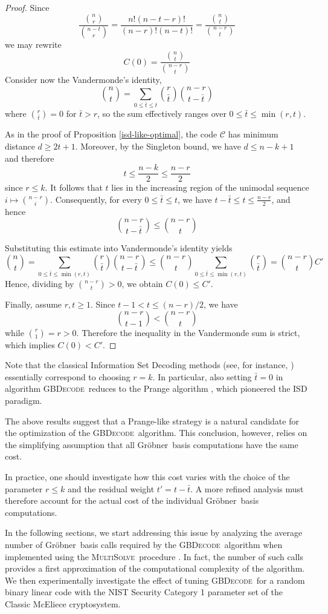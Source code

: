 \documentclass{amsart}
\def\Gr{Gr\"obner}
\def\MultiSolve{{\textsc{MultiSolve}}}
\def\GBDecode{{\textsc{GBDecode}}}
\def\cC{{\mathcal{C}}}
\def\bt{{\bar{t}}}
\begin{document}
\begin{proof}
Since
\[
\frac{\binom{n}{r}}{\binom{n-t}{r}} = \frac{n! (n-t-r)!}{(n-r)! (n-t)!} = \frac{\binom{n}{t}}{\binom{n-r}{t}}
\]
we may rewrite
\[
C(0) = \frac{\binom{n}{t}}{\binom{n-r}{t}}
\]
Consider now the Vandermonde's identity,
\[
\binom{n}{t} = \sum_{0\leq \bt\leq t} \binom{r}{\bt} \binom{n - r}{t - \bt}
\]
where $\binom{r}{\bt} = 0$ for $\bt > r$, so the sum effectively ranges over
$0\leq \bt\leq \min(r,t)$.

As in the proof of Proposition \ref{isd-like-optimal}, the code $\cC$ has minimum
distance $d\geq 2 t + 1$. Moreover, by the Singleton bound, we have $d\leq n - k + 1$ and
therefore
\[
t\leq \frac{n-k}{2}\leq \frac{n-r}{2}
\]
since $r\leq k$. It follows that $t$ lies in the increasing region of the unimodal sequence
$i\mapsto\binom{n-r}{i}$. Consequently, for every $0\leq \bt \leq t$, we have
$t - \bt\leq t\leq \frac{n-r}{2}$, and hence
\[
\binom{n-r}{t - \bt}\leq \binom{n-r}{t}
\]

Substituting this estimate into Vandermonde's identity yields
\[
\binom{n}{t} = \sum_{0\leq \bt\leq \min(r,t)} \binom{r}{\bt}\binom{n - r}{t - \bt} \leq
\binom{n-r}{t} \sum_{0\leq \bt\leq \min(r,t)} \binom{r}{\bt} = \binom{n-r}{t} C'
\]
Hence, dividing by $\binom{n-r}{t} > 0$, we obtain $C(0)\leq C'$.

Finally, assume $r,t\geq 1$. Since $t - 1 < t\leq (n-r)/2$, we have
\[
\binom{n-r}{t-1} < \binom{n-r}{t}
\]
while $\binom{r}{1} = r > 0$. Therefore the inequality in the Vandermonde sum is strict,
which implies $C(0) < C'$.
\end{proof}

Note that the classical Information Set Decoding methods (see, for instance,
\cite{EW}) essentially correspond to choosing $r = k$. In particular, also setting
$\bt = 0$ in algorithm \GBDecode\ reduces to the Prange algorithm \cite{Pra}, which
pioneered the ISD paradigm.

The above results suggest that a Prange-like strategy is a natural candidate
for the optimization of the \GBDecode\ algorithm. This conclusion, however,
relies on the simplifying assumption that all \Gr\ basis computations
have the same cost.

In practice, one should investigate how this cost varies with
the choice of the parameter $r\leq k$ and the residual weight
$t' = t - \bt$. A more refined analysis must therefore account for the
actual cost of the individual \Gr\ basis computations.

In the following sections, we start addressing this issue by analyzing the
average number of \Gr\ basis calls required by the \GBDecode\ algorithm when
implemented using the \MultiSolve\ procedure \cite{LSPTV,LST}. In fact, the number
of such calls provides a first approximation of the computational complexity
of the algorithm. We then experimentally investigate the effect of tuning
\GBDecode\ for a random binary linear code with the NIST Security
Category 1 parameter set of the Classic McEliece cryptosystem.
\end{document}
